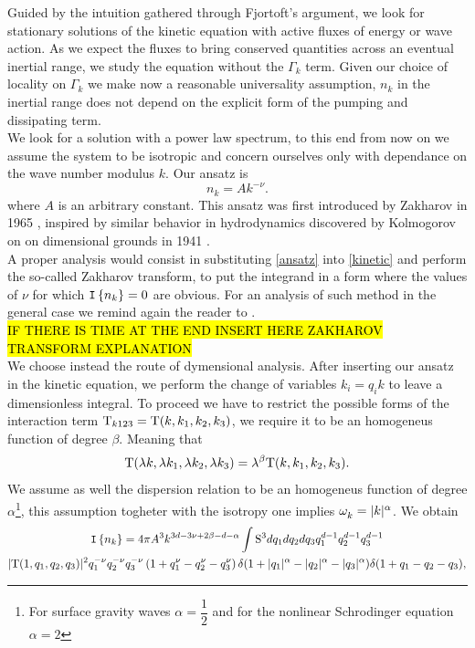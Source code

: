 Guided by the intuition gathered through Fjortoft's argument, we look for stationary solutions of the kinetic equation with active fluxes of energy or wave action. 
As we expect the fluxes to bring conserved quantities across an eventual inertial range, we study the equation without the $\Gamma_k$ term. Given our choice of locality
on $\Gamma_k$ we make now a reasonable universality assumption, $n_k$ in the inertial range does not depend on the explicit form of the pumping and dissipating term.\\
We look for a solution with a power law spectrum, to this end from now on we assume the system to be isotropic and concern ourselves only with dependance on the wave number 
modulus $k$. Our ansatz is  
\begin{equation}
    n_k = A k^{-\nu}.
    \label{ansatz}
\end{equation}
where $A$ is an arbitrary constant. 
This ansatz was first introduced by Zakharov in 1965 \cite{Zakharov1965}, inspired by similar behavior in hydrodynamics discovered by Kolmogorov on on dimensional grounds 
in 1941 \cite{1991}.\\
A proper analysis would consist in substituting \eqref{ansatz} into \eqref{kinetic} and perform the so-called Zakharov transform, to put the integrand in a form where 
the values of $\nu$ for which $\mathtt{I}\left\{n_k\right\} = 0$ are obvious. For an analysis of such method in the general case we remind again the reader to \cite{Zakharov}. \\
\hl{IF THERE IS TIME AT THE END INSERT HERE ZAKHAROV TRANSFORM EXPLANATION}\\
We choose instead the route of dymensional analysis. After inserting our ansatz in the kinetic equation, we perform the change of variables $k_i = q_i k$ to leave a 
dimensionless integral. To proceed we have to restrict the possible forms of the interaction term $\mathrm{T}_{k123} = \mathrm{T}(k, k_1, k_2, k_3) $, we require it to be an homogeneus 
function of degree $\beta$. Meaning that
\begin{equation}
    \mathrm{T}(\lambda k, \lambda k_1,\lambda k_2,\lambda k_3) = \lambda^\beta \mathrm{T}(k, k_1, k_2, k_3).
\end{equation}
We assume as well the dispersion relation to be an homogeneus function of degree $\alpha$\footnote{For surface gravity waves $\alpha = \dfrac{1}{2}$ and for the 
nonlinear Schrodinger equation $\alpha = 2$}, this assumption togheter with the isotropy one implies $\omega^{}_k = |k|^{\alpha}$. We obtain 
\begin{multline}
    \mathtt{I}\left\{n_k\right\} = 4\pi A^3 k^{3d - 3\nu + 2\beta - d - \alpha} \int \mathrm{S}^3dq_1 dq_2 dq_3 q^{d-1}_1 q ^{d-1}_2 q^{d-1}_3 \\
    |\mathrm{T}(1, q_1, q_2, q_3)|^2 q_1^{-\nu}q_2^{-\nu}
    q_3^{-\nu}\left(1 + q_1^\nu - q_2^\nu - q_3^\nu \right) \delta (1 + |q_1|^\alpha - |q_2|^\alpha -|q_3|^\alpha)\delta(1 + q_1 - q_2 -q_3),
\end{multline} 
